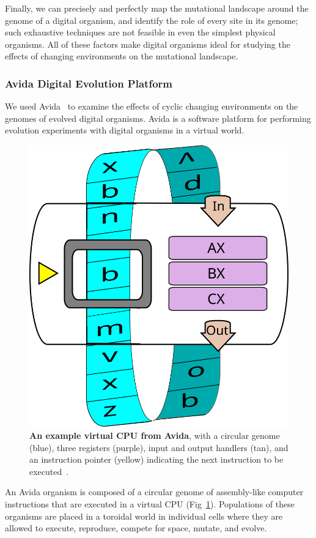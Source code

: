 \documentclass[10pt,letterpaper,final]{article}
\begin{document}
Finally, we can precisely and perfectly map the mutational landscape around the genome of a digital organism, and identify the role of every site in its genome\cite{ofria_evolution_2002}; such exhaustive techniques are not feasible in even the simplest physical organisms.  All of these factors make digital organisms ideal for studying the effects of changing environments on the mutational landscape.

\subsubsection*{Avida Digital Evolution Platform}
We used Avida~\cite{lenski_evolutionary_2003} to examine the effects of cyclic changing environments on the genomes of evolved digital organisms. Avida is a software platform for performing evolution experiments with digital organisms in a virtual world.

\begin{figure}[!h]
\includegraphics[width=0.65\columnwidth]{figures/methods/squishedCPU_extra.png}
\caption{{\bf An example virtual CPU from Avida}, with a circular genome (blue), three registers (purple), input and output handlers (tan), and an instruction pointer (yellow) indicating the next instruction to be executed~\cite{canino-koning_evolution_2016}.%
}\label{fig:cpu}
\end{figure}

An Avida organism is composed of a circular genome of assembly-like computer instructions that are executed in a virtual CPU (Fig~\ref{fig:cpu}). Populations of these organisms are placed in a toroidal world in individual cells where they are allowed to execute, reproduce, compete for space, mutate, and evolve.
\end{document}

